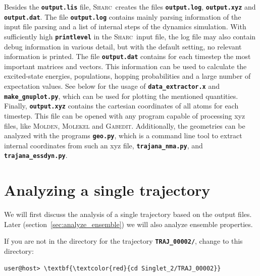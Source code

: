 \documentclass[a4paper,11pt,DIV=15,openany]{scrbook}
\newcommand{\sharc}{\textsc{Sharc}}
\newcommand{\ttt}[1]{\textbf{\texttt{#1}}}
\begin{document}
Besides the \ttt{output.lis} file, \sharc\ creates the files \ttt{output.log}, \ttt{output.xyz} and \ttt{output.dat}. 
The file
\ttt{output.log} contains mainly parsing information of the input file parsing and a list of internal steps of the dynamics simulation. 
With sufficiently high \ttt{printlevel} in the \sharc\ input file, the log file may also contain debug information in various detail, but with the default setting, no relevant information is printed.
The file \ttt{output.dat} contains for each timestep the most important matrices and vectors. 
This information can be used to calculate the excited-state energies, populations, hopping probabilities and a large number of expectation values. 
See below for the usage of \ttt{data\_extractor.x} and \ttt{make\_gnuplot.py}, which can be used for plotting the mentioned quantities.
Finally, \ttt{output.xyz} contains the cartesian coordinates of all atoms for each timestep. 
This file can be opened with any program capable of processing xyz files, like \textsc{Molden}, \textsc{Molekel} and \textsc{Gabedit}. 
Additionally, the geometries can be analyzed with the programs \ttt{geo.py}, which is a command line tool to extract internal coordinates from such an xyz file, \ttt{trajana\_nma.py}, and \ttt{trajana\_essdyn.py}.




\clearpage
\section{Analyzing a single trajectory}

We will first discuss the analysis of a single trajectory based on the output files. 
Later (section~\ref{sec:analyze_ensemble}) we will also analyze ensemble properties. 

If you are not in the directory for the trajectory \ttt{TRAJ\_00002/}, change to this directory:
\begin{Verbatim}[commandchars=\\\{\}]
user@host> \textbf{\textcolor{red}{cd Singlet_2/TRAJ_00002}}
\end{Verbatim}
\end{document}
